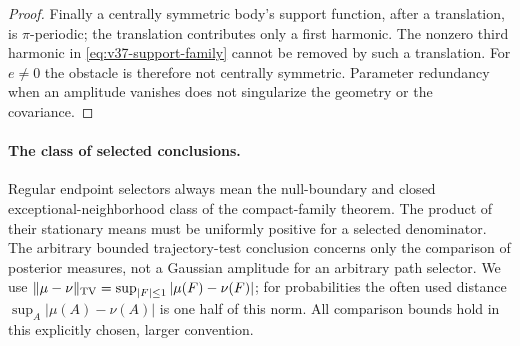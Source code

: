 \begin{proof}
Finally a centrally symmetric body's support function, after a
translation, is $\pi$-periodic; the translation contributes only a
first harmonic. The nonzero third harmonic in \eqref{eq:v37-support-family}
cannot be removed by such a translation. For $e\ne0$ the obstacle is
therefore not centrally symmetric. Parameter redundancy when an
amplitude vanishes does not singularize the geometry or the covariance.
\end{proof}

\paragraph{The class of selected conclusions.}
Regular endpoint selectors always mean the null-boundary and closed
exceptional-neighborhood class of the compact-family theorem. The
product of their stationary means must be uniformly positive for a
selected denominator. The arbitrary bounded trajectory-test conclusion
concerns only the comparison of posterior measures, not a Gaussian
amplitude for an arbitrary path selector. We use
$\|\mu-\nu\|_{\operatorname{TV}}=\sup_{|F|\le1}|\mu(F)-\nu(F)|$;
for probabilities the often used distance
$\sup_A|\mu(A)-\nu(A)|$ is one half of this norm. All comparison
bounds hold in this explicitly chosen, larger convention.
